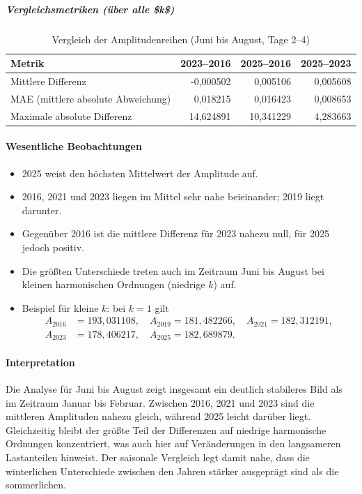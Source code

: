 \documentclass[12pt,oneside]{article}
\begin{document}
\subparagraph{Vergleichsmetriken (über alle \$k\$)}
\begin{table}[H]
\centering
\begin{tabular}{lrrr}
\toprule
Metrik & 2023--2016 & 2025--2016 & 2025--2023 \\
\midrule
Mittlere Differenz & -0,000502 & 0,005106 & 0,005608 \\
MAE (mittlere absolute Abweichung) & 0,018215 & 0,016423 & 0,008653 \\
Maximale absolute Differenz & 14,624891 & 10,341229 & 4,283663 \\
\bottomrule
\end{tabular}
\caption{Vergleich der Amplitudenreihen (Juni bis August, Tage 2--4)}
\end{table}

\paragraph{Wesentliche Beobachtungen}
\begin{itemize}
  \item 2025 weist den höchsten Mittelwert der Amplitude auf.
  \item 2016, 2021 und 2023 liegen im Mittel sehr nahe beieinander; 2019 liegt darunter.
  \item Gegenüber 2016 ist die mittlere Differenz für 2023 nahezu null, für 2025 jedoch positiv.
  \item Die größten Unterschiede treten auch im Zeitraum Juni bis August bei kleinen harmonischen Ordnungen (niedrige $k$) auf.
  \item Beispiel für kleine $k$: bei $k=1$ gilt
  \[
  \begin{aligned}
  A_{2016}&=193{,}031108,\quad A_{2019}=181{,}482266,\quad A_{2021}=182{,}312191,\\
  A_{2023}&=178{,}406217,\quad A_{2025}=182{,}689879.
  \end{aligned}
  \]
\end{itemize}

\paragraph{Interpretation}
Die Analyse für Juni bis August zeigt insgesamt ein deutlich stabileres Bild als im Zeitraum Januar bis Februar.
Zwischen 2016, 2021 und 2023 sind die mittleren Amplituden nahezu gleich, während 2025 leicht darüber liegt.
Gleichzeitig bleibt der größte Teil der Differenzen auf niedrige harmonische Ordnungen konzentriert, was auch
hier auf Veränderungen in den langsameren Lastanteilen hinweist. Der saisonale Vergleich legt damit nahe,
dass die winterlichen Unterschiede zwischen den Jahren stärker ausgeprägt sind als die sommerlichen.
\end{document}
